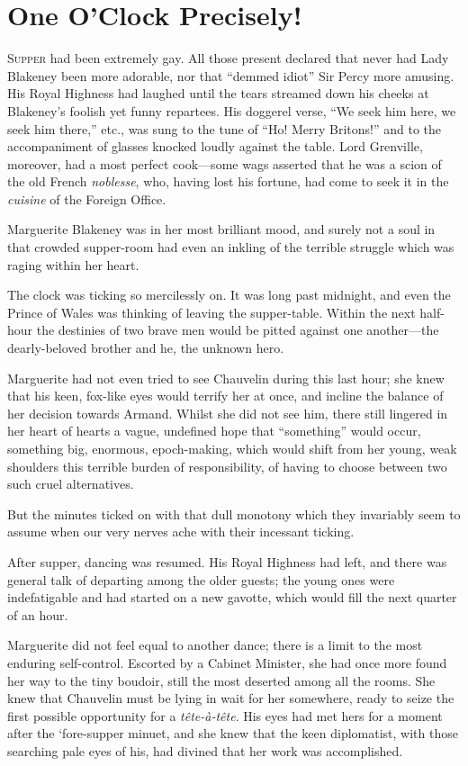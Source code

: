 
\chapter{One O'Clock Precisely!}
\lettrine[lines=4]{S}{upper} had been extremely gay. All those present declared that never had Lady Blakeney been more adorable, nor that \enquote{demmed idiot} Sir Percy more amusing. His Royal Highness had laughed until the tears streamed down his cheeks at Blakeney's foolish yet funny repartees. His doggerel verse, \enquote{We seek him here, we seek him there,} etc., was sung to the tune of \enquote{Ho! Merry Britons!} and to the accompaniment of glasses knocked loudly against the table. Lord Grenville, moreover, had a most perfect cook---some wags asserted that he was a scion of the old French \textit{noblesse}, who, having lost his fortune, had come to seek it in the \textit{cuisine} of the Foreign Office.

Marguerite Blakeney was in her most brilliant mood, and surely not a soul in that crowded supper-room had even an inkling of the terrible struggle which was raging within her heart.

The clock was ticking so mercilessly on. It was long past midnight, and even the Prince of Wales was thinking of leaving the supper-table. Within the next half-hour the destinies of two brave men would be pitted against one another---the dearly-beloved brother and he, the unknown hero.

Marguerite had not even tried to see Chauvelin during this last hour; she knew that his keen, fox-like eyes would terrify her at once, and incline the balance of her decision towards Armand. Whilst she did not see him, there still lingered in her heart of hearts a vague, undefined hope that \enquote{something} would occur, something big, enormous, epoch-making, which would shift from her young, weak shoulders this terrible burden of responsibility, of having to choose between two such cruel alternatives.

But the minutes ticked on with that dull monotony which they invariably seem to assume when our very nerves ache with their incessant ticking.

After supper, dancing was resumed. His Royal Highness had left, and there was general talk of departing among the older guests; the young ones were indefatigable and had started on a new gavotte, which would fill the next quarter of an hour.

Marguerite did not feel equal to another dance; there is a limit to the most enduring self-control. Escorted by a Cabinet Minister, she had once more found her way to the tiny boudoir, still the most deserted among all the rooms. She knew that Chauvelin must be lying in wait for her somewhere, ready to seize the first possible opportunity for a \textit{tête-à-tête}. His eyes had met hers for a moment after the `fore-supper minuet, and she knew that the keen diplomatist, with those searching pale eyes of his, had divined that her work was accomplished.

